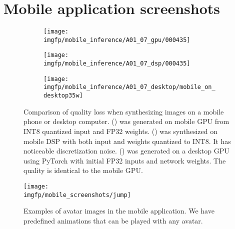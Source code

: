 \section{Mobile application screenshots}
\label{appb:mobile-screenshots}

\begin{figure}[h]
	\centering
	\begin{subfigure}[b]{0.32\textwidth}
		\centering
		\texttt{[image: \\imgfp/mobile\_inference/A01\_07\_gpu/000435]}%
		\caption{}
		\label{appb:mobile:gpu}
	\end{subfigure}
	\hfill
	\begin{subfigure}[b]{0.32\textwidth}
		\centering
		\texttt{[image: \\imgfp/mobile\_inference/A01\_07\_dsp/000435]}
		\caption{}
		\label{appb:mobile:dsp}
	\end{subfigure}
	\hfill
	\begin{subfigure}[b]{0.32\textwidth}
		\centering
		\texttt{[image: \\imgfp/mobile\_inference/A01\_07\_desktop/mobile\_on\_desktop35w]}
		\caption{}
		\label{appb:mobile:desktop}
	\end{subfigure}
	\caption{Comparison of quality loss when synthesizing images on a mobile phone or desktop computer. (\protect{}) was generated on mobile GPU from INT8 quantized input and FP32 weights. (\protect{}) was synthesized on mobile DSP with both input and weights quantized to INT8. It has noticeable discretization noise. (\protect{}) was generated on a desktop GPU using PyTorch with initial FP32 inputs and network weights. The quality is identical to the mobile GPU.}
\end{figure}
\begin{figure}[hb]
	\centering
		\texttt{[image: \\imgfp/mobile\_screenshots/jump]}%
		\label{appb:mobile:jump}
	\caption{Examples of avatar images in the mobile application. We have predefined animations that can be played with any avatar.}
\end{figure}
